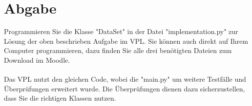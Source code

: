 \documentclass[oneside, 10pt, a4paper, parskip=full]{scrartcl}
\begin{document}
\section{Abgabe}

Programmieren Sie die Klasse "DataSet" in der Datei "implementation.py" zur Lösung der oben beschrieben Aufgabe im VPL.
Sie können auch direkt auf Ihrem Computer programmieren, dazu finden Sie alle drei benötigten Dateien zum Download im Moodle.\\
\\
Das VPL nutzt den gleichen Code, wobei die "main.py" um weitere Testfälle und Überprüfungen erweitert wurde.
Die Überprüfungen dienen dazu sicherzustellen, dass Sie die richtigen Klassen nutzen.
\end{document}
